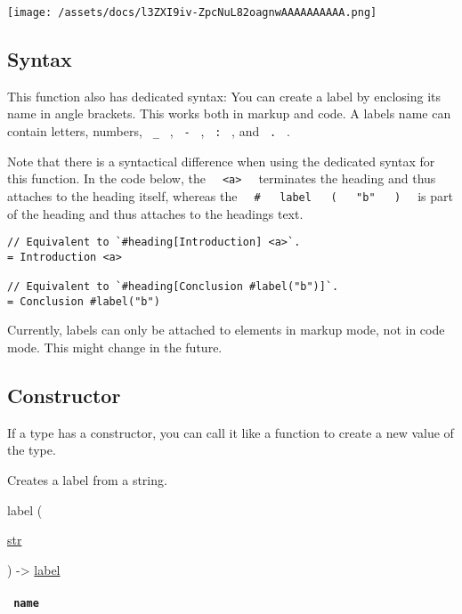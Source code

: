 \texttt{[image: /assets/docs/l3ZXI9iv-ZpcNuL82oagnwAAAAAAAAAA.png]}

\subsection{Syntax}\label{syntax}

This function also has dedicated syntax: You can create a label by
enclosing its name in angle brackets. This works both in markup and
code. A label\textquotesingle s name can contain letters, numbers,
\texttt{\ \_\ } , \texttt{\ -\ } , \texttt{\ :\ } , and \texttt{\ .\ } .

Note that there is a syntactical difference when using the dedicated
syntax for this function. In the code below, the
\texttt{\ }{\texttt{\ \textless{}a\textgreater{}\ }}\texttt{\ }
terminates the heading and thus attaches to the heading itself, whereas
the
\texttt{\ }{\texttt{\ \#\ }}\texttt{\ }{\texttt{\ label\ }}\texttt{\ }{\texttt{\ (\ }}\texttt{\ }{\texttt{\ "b"\ }}\texttt{\ }{\texttt{\ )\ }}\texttt{\ }
is part of the heading and thus attaches to the
heading\textquotesingle s text.

\begin{verbatim}
// Equivalent to `#heading[Introduction] <a>`.
= Introduction <a>

// Equivalent to `#heading[Conclusion #label("b")]`.
= Conclusion #label("b")
\end{verbatim}

Currently, labels can only be attached to elements in markup mode, not
in code mode. This might change in the future.

\subsection{\texorpdfstring{Constructor
{}}{Constructor }}\label{constructor}

\label{constructor-constructor-tooltip}
If a type has a constructor, you can call it like a function to create a
new value of the type.

Creates a label from a string.

{ label } (

{ \href{/docs/reference/foundations/str/}{str} }

) -\textgreater{} \href{/docs/reference/foundations/label/}{label}

\paragraph{\texorpdfstring{\texttt{\ name\ }}{ name }}\label{constructor-name}

